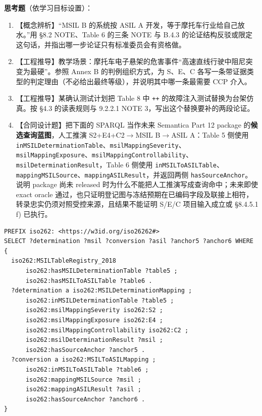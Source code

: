 \textbf{思考题}（依学习目标设置）：

\begin{enumerate}
\item 【概念辨析】“MSIL B 的系统按 ASIL A 开发，等于摩托车行业给自己放水。”用 §8.2 NOTE、Table 6 的三条 NOTE 与 B.4.3 的论证结构反驳或限定这句话，并指出哪一步论证只有标准委员会有资格做。
\item 【工程推导】教学场景：摩托车电子悬架的危害事件“高速直线行驶中阻尼突变为最硬”。参照 Annex B 的判例组织方式，为 S、E、C 各写一条带证据类型的判定理由（不必给出最终等级），并说明其中哪一条最需要 CCP 介入。
\item 【工程推导】某确认测试计划把 Table 8 中 \nolinkurl{++} 的故障注入测试替换为台架仿真。按 §4.3 的读表规则与 9.2.2.1 NOTE 3，写出这个替换要补的两段论证。
\item 【合同设计题】把下面的 SPARQL 当作未来 Semantica Part 12 package 的\textbf{候选查询蓝图}，人工推演 S2+E4+C2\(\rightarrow\)MSIL B\(\rightarrow\)ASIL A：Table 5 侧使用 \nolinkurl{inMSILDeterminationTable}、\nolinkurl{msilMappingSeverity}、\nolinkurl{msilMappingExposure}、\nolinkurl{msilMappingControllability}、\nolinkurl{msilDeterminationResult}，Table 6 侧使用 \nolinkurl{inMSILToASILTable}、\nolinkurl{mappingMSILSource}、\nolinkurl{mappingASILResult}，并返回两侧 \nolinkurl{hasSourceAnchor}。说明 package 尚未 released 时为什么不能把人工推演写成查询命中；未来即使 exact oracle 通过，也只证明登记图与冻结预期在已编码字段及联接上相符，转录忠实仍须对照受控来源，且结果不能证明 S/E/C 项目输入成立或 §8.4.5.1 f) 已执行。
\end{enumerate}

\nopagebreak[4]
\begin{codebox}
\begin{Verbatim}[fontsize=\small,breaklines=true,breakanywhere=true,breaksymbolleft={},breaksymbolright={}]
PREFIX iso262: <https://w3id.org/iso26262#>
SELECT ?determination ?msil ?conversion ?asil ?anchor5 ?anchor6 WHERE {
  iso262:MSILTableRegistry_2018
      iso262:hasMSILDeterminationTable ?table5 ;
      iso262:hasMSILToASILTable ?table6 .
  ?determination a iso262:MSILDeterminationMapping ;
      iso262:inMSILDeterminationTable ?table5 ;
      iso262:msilMappingSeverity iso262:S2 ;
      iso262:msilMappingExposure iso262:E4 ;
      iso262:msilMappingControllability iso262:C2 ;
      iso262:msilDeterminationResult ?msil ;
      iso262:hasSourceAnchor ?anchor5 .
  ?conversion a iso262:MSILToASILMapping ;
      iso262:inMSILToASILTable ?table6 ;
      iso262:mappingMSILSource ?msil ;
      iso262:mappingASILResult ?asil ;
      iso262:hasSourceAnchor ?anchor6 .
}
\end{Verbatim}
\end{codebox}

